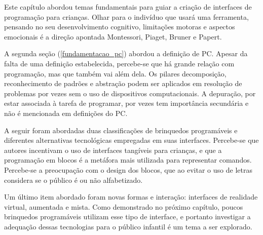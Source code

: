 Este capítulo abordou temas fundamentais para guiar a criação de interfaces de programação para crianças. Olhar para o indivíduo que usará uma ferramenta, pensando no seu desenvolvimento cognitivo, limitações motoras e aspectos emocionais é a direção apontada Montessori, Piaget, Bruner e Papert. 

A segunda seção (\autoref{fundamentacao_pc}) abordou a definição de \acl{PC}. Apesar da falta de uma definição estabelecida, percebe-se que há grande relação com programação, mas que também vai além dela. Os pilares decomposição, reconhecimento de padrões e abstração podem ser aplicados em resolução de problemas por vezes sem o uso de dispositivos computacionais. A depuração, por estar associada à tarefa de programar, por vezes tem importância secundária e não é mencionada em definições do PC. 

A seguir foram abordadas duas classificações de brinquedos programáveis e diferentes alternativas tecnológicas empregadas em suas interfaces. Percebe-se que autores incentivam o uso de interfaces tangíveis para crianças, e que a programação em blocos é a metáfora mais utilizada para representar comandos. Percebe-se a preocupação com o design dos blocos, que ao evitar o uso de letras considera se o público é ou não alfabetizado.

Um último item abordado foram novas formas e interação: interfaces de realidade virtual, aumentada e mista. Como demonstrado no próximo capítulo, poucos brinquedos programáveis utilizam esse tipo de interface, e portanto investigar a adequação dessas tecnologias para o público infantil é um tema a ser explorado.
